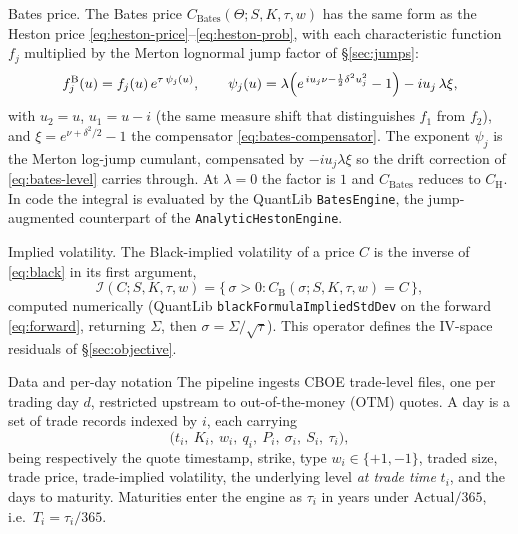 \documentclass[a4paper, 11pt, reqno]{amsart}
\makeatletter
\def\section{\@startsection{section}{1}%
	\z@{.7\linespacing\@plus\linespacing}{.5\linespacing}%
	{\normalfont\bfseries\centering}}
\def\paragraph{\@startsection{paragraph}{4}%
	\z@\z@{-\fontdimen2\font}%
	{\normalfont\bfseries}}
\makeatother
\begin{document}
			\paragraph{Bates price.} The Bates price $C_{\mathrm{Bates}}(\Theta; S,K,\tau,w)$ has the same form
			as the Heston price \eqref{eq:heston-price}--\eqref{eq:heston-prob}, with each characteristic
			function $f_j$ multiplied by the Merton lognormal jump factor of \S\ref{sec:jumps}:
			\begin{equation}\label{eq:bates-cf}
				f_j^{\mathrm{B}}(u) = f_j(u)\,e^{\tau\,\psi_j(u)}, \qquad
				\psi_j(u) = \lambda\Bigl( e^{\,i u_j \nu - \frac12 \delta^2 u_j^2} - 1 \Bigr) - i u_j\,\lambda\xi,
			\end{equation}
			with $u_2 = u$, $u_1 = u - i$ (the same measure shift that distinguishes $f_1$ from $f_2$), and
			$\xi = e^{\nu + \delta^2/2} - 1$ the compensator \eqref{eq:bates-compensator}. The exponent $\psi_j$
			is the Merton log-jump cumulant, compensated by $-i u_j \lambda\xi$ so the drift correction of
			\eqref{eq:bates-level} carries through. At $\lambda=0$ the factor is $1$ and $C_{\mathrm{Bates}}$
			reduces to $C_{\mathrm{H}}$. In code the integral is evaluated by the QuantLib \texttt{BatesEngine},
			the jump-augmented counterpart of the \texttt{AnalyticHestonEngine}.
			
			\paragraph{Implied volatility.} The Black-implied volatility of a price $C$ is the inverse
			of \eqref{eq:black} in its first argument,
			\begin{equation}\label{eq:ivinv}
				\mathcal{I}(C; S,K,\tau,w)
				= \bigl\{\, \sigma>0 : C_{\mathrm{B}}(\sigma; S,K,\tau,w) = C \,\bigr\},
			\end{equation}
			computed numerically (QuantLib \texttt{blackFormulaImpliedStdDev} on the forward
			\eqref{eq:forward}, returning $\Sigma$, then $\sigma=\Sigma/\sqrt{\tau}$). This operator
			defines the IV-space residuals of \S\ref{sec:objective}.
	
	\section{Data and per-day notation}\label{sec:data}
		The pipeline ingests CBOE trade-level files, one per trading day $d$, restricted upstream
		to out-of-the-money (OTM) quotes. A day is a set of trade records indexed by $i$, each
		carrying
		\begin{equation}
			\bigl(t_i,\ K_i,\ w_i,\ q_i,\ P_i,\ \sigma_i,\ S_i,\ \tau_i\bigr),
		\end{equation}
		being respectively the quote timestamp, strike, type $w_i\in\{+1,-1\}$, traded size, trade
		price, trade-implied volatility, the underlying level \emph{at trade time} $t_i$, and the
		days to maturity. Maturities enter the engine as $\tau_i$ in years under
		$\mathrm{Actual}/365$, i.e.\ $T_i = \tau_i/365$.
		
\end{document}
